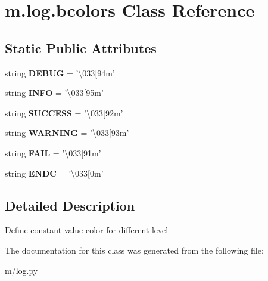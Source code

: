 \hypertarget{classm_1_1log_1_1bcolors}{\section{m.\-log.\-bcolors Class Reference}
\label{classm_1_1log_1_1bcolors}
}
\subsection*{Static Public Attributes}
\begin{DoxyCompactItemize}
\item 
\hypertarget{classm_1_1log_1_1bcolors_a930ec546f4b168584a472688b7f76159}{string {\bfseries D\-E\-B\-U\-G} = '\textbackslash{}033\mbox{[}94m'}\label{classm_1_1log_1_1bcolors_a930ec546f4b168584a472688b7f76159}

\item 
\hypertarget{classm_1_1log_1_1bcolors_ac1f6785cf1156a6e807bd34becae40cc}{string {\bfseries I\-N\-F\-O} = '\textbackslash{}033\mbox{[}95m'}\label{classm_1_1log_1_1bcolors_ac1f6785cf1156a6e807bd34becae40cc}

\item 
\hypertarget{classm_1_1log_1_1bcolors_a08e96f78e19ddcbeb35803253921a8d6}{string {\bfseries S\-U\-C\-C\-E\-S\-S} = '\textbackslash{}033\mbox{[}92m'}\label{classm_1_1log_1_1bcolors_a08e96f78e19ddcbeb35803253921a8d6}

\item 
\hypertarget{classm_1_1log_1_1bcolors_adf7b4f5d7944a6513fc8c41d6a5dc14b}{string {\bfseries W\-A\-R\-N\-I\-N\-G} = '\textbackslash{}033\mbox{[}93m'}\label{classm_1_1log_1_1bcolors_adf7b4f5d7944a6513fc8c41d6a5dc14b}

\item 
\hypertarget{classm_1_1log_1_1bcolors_aefe04c066409cd17944030d7c8f7da78}{string {\bfseries F\-A\-I\-L} = '\textbackslash{}033\mbox{[}91m'}\label{classm_1_1log_1_1bcolors_aefe04c066409cd17944030d7c8f7da78}

\item 
\hypertarget{classm_1_1log_1_1bcolors_a2ca52c51d05abcaa81c0c4703741cd0c}{string {\bfseries E\-N\-D\-C} = '\textbackslash{}033\mbox{[}0m'}\label{classm_1_1log_1_1bcolors_a2ca52c51d05abcaa81c0c4703741cd0c}

\end{DoxyCompactItemize}


\subsection{Detailed Description}
\begin{DoxyVerb}Define constant value color for different level
\end{DoxyVerb}
 

The documentation for this class was generated from the following file\-:\begin{DoxyCompactItemize}
\item 
m/log.\-py\end{DoxyCompactItemize}
